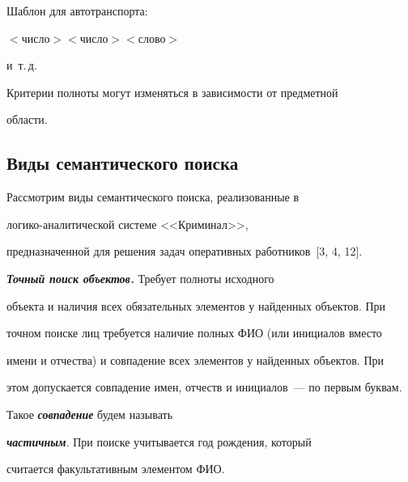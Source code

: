     


         \smallskip


         


    Шаблон для автотранспорта: 


    $<$число$>$$<$число$>$$<$слово$>$ 


и~т.\,д.


    


    Критерии полноты могут изменяться в зависимости от предметной 


области. 


    


    \subsection{Виды семантического поиска}


    


    Рассмотрим виды семантического поиска, реализованные в 


    ло\-ги\-ко-ана\-ли\-ти\-че\-ской сис\-те\-ме <<Криминал>>, 


предназначенной для решения задач оперативных работников~[3, 4, 12].


    


    \smallskip


    


    {\bfseries\textit{Точный поиск объектов.}} Требует полноты исходного 


объекта и наличия всех обязательных элементов у найденных объектов. При 


точном поиске лиц требуется наличие полных ФИО (или инициалов вместо 


имени и отчества) и совпадение всех элементов у найденных объектов. При 


этом допускается совпадение имен, отчеств и инициалов~--- по первым буквам. 


Такое {\bfseries\textit{совпадение}} будем называть 


{\bfseries\textit{частичным}}. При поиске учитывается год рождения, который 


считается факультативным элементом ФИО. 


    


    \smallskip


